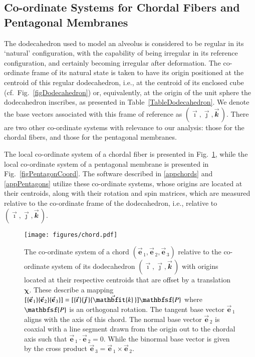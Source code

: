 \subsection{Co-ordinate Systems for Chordal Fibers and Pentagonal Membranes}

The dodecahedron used to model an alveolus is considered to be regular in its `natural' configuration, with the capability of being irregular in its reference configuration, and certainly becoming irregular after deformation.  The co-ordinate frame of its natural state is taken to have its origin positioned at the centroid of this regular dodecahedron, i.e., at the centroid of its enclosed cube (cf.\ Fig.~\ref{figDodecahedron}) or, equivalently, at the origin of the unit sphere the dodecahedron inscribes, as presented in Table~\ref{TableDodecahedron}.  We denote the base vectors associated with this frame of reference as $( \vec{\boldsymbol{\imath}} , \vec{\boldsymbol{\jmath}} , \vec{\mathbfit{k}} \, )$.  There are two other co-ordinate systems with relevance to our analysis: those for the chordal fibers, and those for the pentagonal membranes.

The local co-ordinate system of a chordal fiber is presented in Fig.~\ref{figchord}, while the local co-ordinate system of a pentagonal membrane is presented in Fig.~\ref{figPentagonCoord}.  The software described in \ref{appchords} and \ref{appPentagons} utilize these co-ordinate systems, whose origins are located at their centroids, along with their rotation and spin matrices, which are measured relative to the co-ordinate frame of the dodecahedron, i.e., relative to $( \vec{\boldsymbol{\imath}} , \vec{\boldsymbol{\jmath}} , \vec{\mathbfit{k}} \, )$.

\begin{figure}
    \centering
    \texttt{[image: figures/chord.pdf]}
    \caption{The co-ordinate system of a chord $( \vec{\mathbf{e}}_{\,1} , \vec{\mathbf{e}}_{\,2} , \vec{\mathbf{e}}_{\,3} )$ relative to the co-ordinate system of its dodecahedron $( \vec{\boldsymbol{\imath}} , \vec{\boldsymbol{\jmath}} , \vec{\mathbfit{k}} \,)$ with origins located at their respective centroids that are offset by a translation $\boldsymbol{\chi}$.  These describe a mapping $[ \{ \vec{\mathbf{e}}_{\,1} \} \{ \vec{\mathbf{e}}_{\,2} \} \{ \vec{\mathbf{e}}_{\,3} \} ] = [ \{ \vec{\boldsymbol{\imath}} \, \}\{ \vec{\boldsymbol{\jmath}} \, \}\{ \vec{\mathbfit{k}} \, \} ] \mathbfsf{P}$ where $\mathbfsf{P}$ is an orthogonal rotation.  The tangent base vector $\vec{\mathbf{e}}_{\,1}$ aligns with the axis of this chord. The normal base vector $\vec{\mathbf{e}}_{\,2}$ is coaxial with a line segment drawn from the origin out to the chordal axis such that $\vec{\mathbf{e}}_{\,1} \cdot \vec{\mathbf{e}}_{\,2} = 0$. While the binormal base vector is given by the cross product $\vec{\mathbf{e}}_{\,3} = \vec{\mathbf{e}}_{\,1} \times \vec{\mathbf{e}}_{\,2}$.}
    \label{figchord}
\end{figure}

